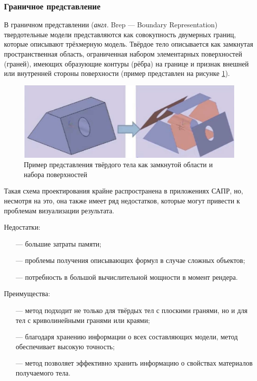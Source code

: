 \subsubsection{Граничное представление}
В граничном представлении (\textit{англ.} Brep --- Boundary Representation) \cite{brep} твердотельные модели представляются как совокупность 
двумерных границ, которые описывают трёхмерную модель. 
Твёрдое тело описывается как замкнутая пространственная область, ограниченная набором элементарных поверхностей (граней), имеющих образующие контуры (рёбра) на границе и признак внешней или внутренней стороны поверхности (пример представлен на рисунке \ref{fig:brep}). 

\begin{figure}[h]
	\centering
	\captionsetup{justification=centering}
	\includegraphics[width=160mm]{img/brep.png}
	\caption{Пример представления твёрдого тела как замкнутой области и набора поверхностей}
	\label{fig:brep}
\end{figure}

Такая схема проектирования крайне распространена в приложениях 
САПР, но, несмотря на это, она также имеет ряд недостатков, которые могут 
привести к проблемам визуализации результата.

Недостатки:
\begin{itemize}[leftmargin=1.6\parindent]
	\item[---] большие затраты памяти;
	\item[---] проблемы получения описывающих формул в случае сложных объектов;
	\item[---] потребность в большой вычислительной мощности в момент рендера.
\end{itemize}

Преимущества:
\begin{itemize}[leftmargin=1.6\parindent]
	\item[---] метод подходит не только для твёрдых тел с плоскими гранями, но и для 
	тел с криволинейными гранями или краями;
	\item[---] благодаря хранению информации о всех составляющих модели, метод 
	обеспечивает высокую точность;
	\item[---] метод позволяет эффективно хранить информацию о свойствах материалов получаемого тела.
\end{itemize}

